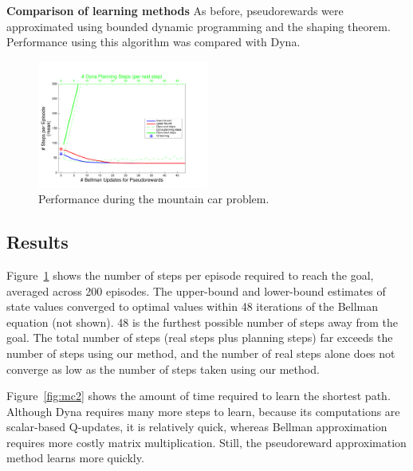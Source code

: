 \documentclass[letterpaper]{article}
\begin{document}
\noindent
\textbf{Comparison of learning methods} As before, pseudorewards were approximated using bounded dynamic programming and the shaping theorem. Performance using this algorithm was compared with Dyna.

\begin{figure}[H]
\centering
\includegraphics[width=0.5\textwidth]{MC_learning_vs_PRiterations_DYNA_mean}
\caption{Performance during the mountain car problem.}
\label{fig:mc1}
\end{figure}

\subsection{Results}

Figure~\ref{fig:mc1} shows the number of steps per episode required to reach the goal, averaged across 200 episodes. The upper-bound and lower-bound estimates of state values converged to optimal values within 48 iterations of the Bellman equation (not shown). 48 is the furthest possible number of steps away from the goal.
The total number of steps (real steps plus planning steps) far exceeds the number of steps using our method, and the number of real steps alone does not converge as low as the number of steps taken using our method.

Figure~\ref{fig:mc2} shows the amount of time required to learn the shortest path. Although Dyna requires many more steps to learn, because its computations are scalar-based Q-updates, it is relatively quick, whereas Bellman approximation requires more costly matrix multiplication. Still, the pseudoreward approximation method learns more quickly.
\end{document}
